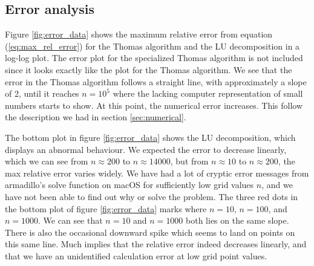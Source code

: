 \documentclass{emulateapj}
\begin{document}
    \subsection{Error analysis}
    
        Figure \ref{fig:error_data} shows the maximum relative error from equation (\ref{eq:max_rel_error}) for the Thomas algorithm and the LU decomposition in a log-log plot. The error plot for the specialized Thomas algorithm is not included since it looks exactly like the plot for the Thomas algorithm. We see that the error in the Thomas algorithm follows a straight line, with approximately a slope of 2, until it reaches \(n=10^{5}\) where the lacking computer representation of small numbers starts to show. At this point, the numerical error increases. This follow the description we had in section \ref{sec:numerical}.%
        
        The bottom plot in figure \ref{fig:error_data} shows the LU decomposition, which displays an abnormal behaviour. We expected the error to decrease linearly, which we can see from \(n \approx 200\) to \(n \approx 14000\), but from \(n \approx 10\) to \(n \approx 200\), the max relative error varies widely. We have had a lot of cryptic error messages from armadillo's solve function on macOS for sufficiently low grid values \(n\), and we have not been able to find out why or solve the problem. The three red dots in the bottom plot of figure \ref{fig:error_data} marks where \(n = 10\), \(n=100\), and \(n=1000\). We can see that \(n=10\) and \(n=1000\) both lies on the same slope. There is also the occasional downward spike which seems to land on points on this same line. Much implies that the relative error indeed decreases linearly, and that we have an unidentified calculation error at low grid point values.
        
   
\end{document}
